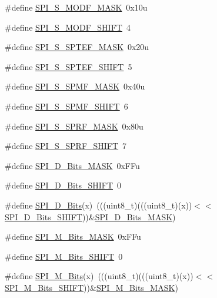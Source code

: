 \begin{DoxyCompactItemize}
\item 
\#define \hyperlink{group___s_p_i___register___masks_gae3b092b4e35b25cabf209f60637cb1f8}{S\+P\+I\+\_\+\+S\+\_\+\+M\+O\+D\+F\+\_\+\+M\+A\+SK}~0x10u
\item 
\#define \hyperlink{group___s_p_i___register___masks_ga1a037c05626e7bd1f84704dd98d620b9}{S\+P\+I\+\_\+\+S\+\_\+\+M\+O\+D\+F\+\_\+\+S\+H\+I\+FT}~4
\item 
\#define \hyperlink{group___s_p_i___register___masks_ga3f05ea8ee4b9eda3b55af33b0bbfe829}{S\+P\+I\+\_\+\+S\+\_\+\+S\+P\+T\+E\+F\+\_\+\+M\+A\+SK}~0x20u
\item 
\#define \hyperlink{group___s_p_i___register___masks_ga6c56a82dfa277e081682a45488b61b7f}{S\+P\+I\+\_\+\+S\+\_\+\+S\+P\+T\+E\+F\+\_\+\+S\+H\+I\+FT}~5
\item 
\#define \hyperlink{group___s_p_i___register___masks_gac6198d0ae23c413b2635a31550272d63}{S\+P\+I\+\_\+\+S\+\_\+\+S\+P\+M\+F\+\_\+\+M\+A\+SK}~0x40u
\item 
\#define \hyperlink{group___s_p_i___register___masks_ga8e59ca0da277d00018b2ee701bd19ec3}{S\+P\+I\+\_\+\+S\+\_\+\+S\+P\+M\+F\+\_\+\+S\+H\+I\+FT}~6
\item 
\#define \hyperlink{group___s_p_i___register___masks_ga1cada84cbeaeb0de6e2c496da39da693}{S\+P\+I\+\_\+\+S\+\_\+\+S\+P\+R\+F\+\_\+\+M\+A\+SK}~0x80u
\item 
\#define \hyperlink{group___s_p_i___register___masks_ga8f3cb2c492f263ccb54220066f1bb04d}{S\+P\+I\+\_\+\+S\+\_\+\+S\+P\+R\+F\+\_\+\+S\+H\+I\+FT}~7
\item 
\#define \hyperlink{group___s_p_i___register___masks_ga4be13a4d32a80a5054b5c7b555cacf96}{S\+P\+I\+\_\+\+D\+\_\+\+Bits\+\_\+\+M\+A\+SK}~0x\+F\+Fu
\item 
\#define \hyperlink{group___s_p_i___register___masks_ga7b4038420399880e8554f8078e0fc4a8}{S\+P\+I\+\_\+\+D\+\_\+\+Bits\+\_\+\+S\+H\+I\+FT}~0
\item 
\#define \hyperlink{group___s_p_i___register___masks_gaef5e938b19ce8cb77e0af81415e27d2a}{S\+P\+I\+\_\+\+D\+\_\+\+Bits}(x)~(((uint8\+\_\+t)(((uint8\+\_\+t)(x))$<$$<$\hyperlink{group___s_p_i___register___masks_ga7b4038420399880e8554f8078e0fc4a8}{S\+P\+I\+\_\+\+D\+\_\+\+Bits\+\_\+\+S\+H\+I\+FT}))\&\hyperlink{group___s_p_i___register___masks_ga4be13a4d32a80a5054b5c7b555cacf96}{S\+P\+I\+\_\+\+D\+\_\+\+Bits\+\_\+\+M\+A\+SK})
\item 
\#define \hyperlink{group___s_p_i___register___masks_ga9767f876397867fe5481f0f2e8fe7426}{S\+P\+I\+\_\+\+M\+\_\+\+Bits\+\_\+\+M\+A\+SK}~0x\+F\+Fu
\item 
\#define \hyperlink{group___s_p_i___register___masks_ga260750fc368376f78fd1fbdea6353327}{S\+P\+I\+\_\+\+M\+\_\+\+Bits\+\_\+\+S\+H\+I\+FT}~0
\item 
\#define \hyperlink{group___s_p_i___register___masks_ga1884f92ef71c445ab9969f1c474635d3}{S\+P\+I\+\_\+\+M\+\_\+\+Bits}(x)~(((uint8\+\_\+t)(((uint8\+\_\+t)(x))$<$$<$\hyperlink{group___s_p_i___register___masks_ga260750fc368376f78fd1fbdea6353327}{S\+P\+I\+\_\+\+M\+\_\+\+Bits\+\_\+\+S\+H\+I\+FT}))\&\hyperlink{group___s_p_i___register___masks_ga9767f876397867fe5481f0f2e8fe7426}{S\+P\+I\+\_\+\+M\+\_\+\+Bits\+\_\+\+M\+A\+SK})
\end{DoxyCompactItemize}


